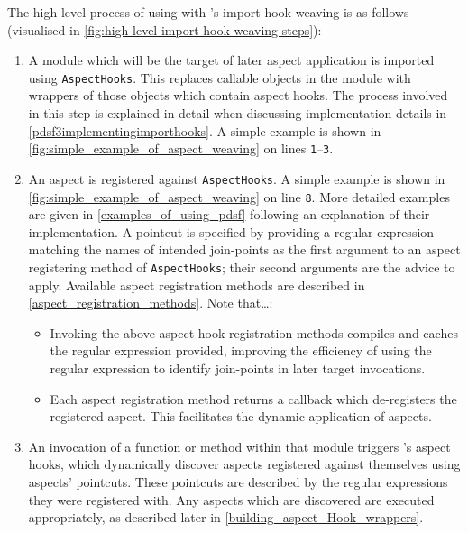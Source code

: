 The high-level process of using \aop{} with \pdsfthree{}'s import hook weaving is as
follows (visualised in \cref{fig:high-level-import-hook-weaving-steps}):

\begin{enumerate}\label{urgency_mentioned_in_passing}
    \item A module which will be the target of later aspect application is
    imported using \lstinline{AspectHooks}. This replaces callable objects in
    the module with wrappers of those objects which contain aspect hooks. The
    process involved in this step is explained in detail when discussing
    implementation details in \cref{pdsf3implementingimporthooks}. A simple
    example is shown in \cref{fig:simple_example_of_aspect_weaving} on lines
    \texttt{1}--\texttt{3}. 
    \item An aspect is registered against \lstinline{AspectHooks}. A simple
    example is shown in \cref{fig:simple_example_of_aspect_weaving} on line
    \texttt{8}. More detailed examples are given in
    \cref{examples_of_using_pdsf} following an explanation of their
    implementation. A pointcut is specified by providing a regular expression
    matching the names of intended join-points as the first argument to an
    aspect registering method of \lstinline{AspectHooks}; their second arguments
    are the advice to apply. Available aspect registration methods are described
    in \cref{aspect_registration_methods}. Note that\ldots{}:
    \begin{itemize}
        \item Invoking the above aspect hook registration methods compiles and
        caches the regular expression provided, improving the efficiency of
        using the regular expression to identify join-points in later target
        invocations.
        \item Each aspect registration method returns a callback which de-registers
        the registered aspect. This facilitates the dynamic application of
        aspects.
    \end{itemize}
    \item  An invocation of a function or method within that module triggers
    \pdsfthree{}'s aspect hooks, which dynamically discover aspects registered
    against themselves using aspects' pointcuts. These pointcuts are described
    by the regular expressions they were registered with. Any aspects which are
    discovered are executed appropriately, as described later in
    \cref{building_aspect_Hook_wrappers}.
\end{enumerate}

